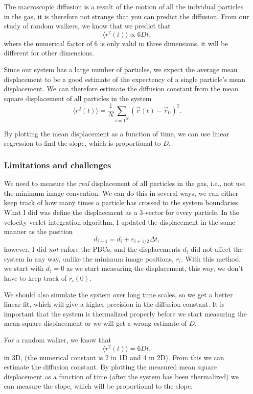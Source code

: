\documentclass[a4paper, 11pt, notitlepage, english]{article}
\begin{document}
The macroscopic diffusion is a result of the motion of all the indvidual particles in the gas, it is therefore not strange that you can predict the diffusion. From our study of random walkers, we know that we predict that
$$\langle r^2(t) \rangle \propto 6D t,$$
where the numerical factor of $6$ is only valid in three dimensions, it will be different for other dimensions.

Since our system has a large number of particles, we expect the average mean displacement to be a good estimate of the expectency of a single particle's mean displacement. We can therefore estimate the diffusion constant from the mean square displacement of all particles in the system
$$\langle r^2(t) \rangle = \frac{1}{N}\sum_{i=1^N} (\vec{r}(t) - \vec{r}_{0})^2.$$

By plotting the mean displacement as a function of time, we can use linear regression to find the slope, which is proportional to $D$.

\subsubsection*{Limitations and challenges}

We need to measure the \emph{real} displacement of all particles in the gas, i.e., not use the minimum image convention. We can do this in several ways, we can either keep track of how many times a particle has crossed to the system boundaries. What I did was define the displacement as a 3-vector for every particle. In the velocity-verlet integration algorithm, I updated the displacement in the same manner as the position
$$d_{i+1} = d_i + v_{i+1/2}\Delta t,$$
however, I did \emph{not} enfore the PBCs, and the displacements $d_i$ did not affect the system in any way, unlike the minimum image positions, $r_i$. With this method, we start with $d_i = 0$ as we start measuring the displacement, this way, we don't have to keep track of $r_i(0)$.

We should also simulate the system over long time scales, so we get a better linear fit, which will give a higher precision in the diffusion constant. It is important that the system is thermalized properly before we start measuring the mean square displacement or we will get a wrong estimate of $D$.

For a random walker, we know that
$$\langle r^2(t) \rangle = 6 D t,$$
in 3D, (the numerical constant is 2 in 1D and 4 in 2D). From this we can estimate the diffusion constant. By plotting the measured mean square displacement as a function of time (after the system has been thermalized) we can measure the slope, which will be proportional to the slope.
\end{document}
